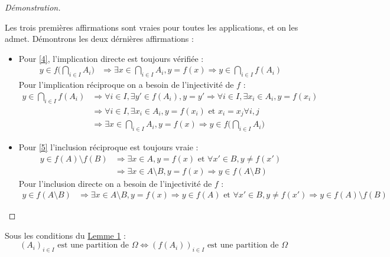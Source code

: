 \begin{proof}[Démonstration]\label{demo1}
\hfill

\noindent
Les trois premières affirmations sont vraies pour toutes les applications, et on les admet. Démontrons les deux dérnières affirmations :
\begin{itemize}
\item  Pour \ref{4}, l'implication directe est toujours vérifiée :
  \begin{align*}
    y \in f\big(\bigcap_{i \in I} A_i \big) &\Rightarrow \exists x \in \bigcap_{i \in I} A_i, y=f(x) \Rightarrow y \in \bigcap_{i \in I} f(A_i)
  \end{align*}
  Pour l'implication réciproque on a besoin de l'injectivité de $f$ :
  \begin{align*}
    y \in \bigcap_{i \in I} f(A_i) &\Rightarrow \forall i \in I, \exists y' \in f(A_i), y=y'
    \Rightarrow \forall i \in I, \exists x_i \in A_i, y=f(x_i)\\
    &\Rightarrow \forall i \in I, \exists x_i \in A_i, y=f(x_i) \text{ et } x_i = x_j \forall i,j \\
    &\Rightarrow \exists x \in \bigcap_{i \in I}A_i, y=f(x) \Rightarrow y \in f\big(\bigcap_{i \in I}A_i\big)
  \end{align*}
\item  Pour \ref{5} l'inclusion réciproque est toujours vraie :
  \begin{align*}
    y \in f(A) \text{\textbackslash} f(B) &\Rightarrow \exists x \in A, y=f(x) \text{ et } \forall x' \in B, y \neq  f(x')\\
      &\Rightarrow \exists x \in A \text{\textbackslash} B, y=f(x) \Rightarrow y \in f(A \text{\textbackslash} B)
  \end{align*}
  Pour l'inclusion directe on a besoin de l'injectivité de $f$ :
  \begin{align*}
    y \in f(A \text{\textbackslash} B) &\Rightarrow \exists x \in A\text{\textbackslash} B, y=f(x) \Rightarrow y \in f(A) \text{ et } \forall x' \in B, y \neq f(x') \Rightarrow  y \in f(A) \text{\textbackslash} f(B)
  \end{align*}
\end{itemize}
\end{proof}
\begin{Cor}\label{lemme 2}
  Sous les conditions du \hyperref[lemme 1]{Lemme 1} :
  $$(A_i)_{i \in I} \text{ est une partition de } \Omega \Leftrightarrow  (f(A_i))_{i \in I} \text{ est une partition de } \Omega$$
\end{Cor}
